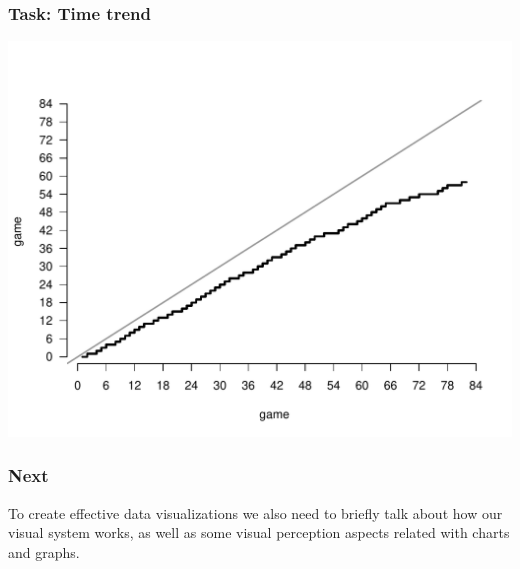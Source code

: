 \documentclass[12pt]{beamer}\usepackage[]{graphicx}\usepackage[]{color}
\makeatletter
\def\maxwidth{ %
  \ifdim\Gin@nat@width>\linewidth
    \linewidth
  \else
    \Gin@nat@width
  \fi
}
\newenvironment{knitrout}{}{} %
\makeatother
\begin{document}
\begin{frame}[fragile]
\frametitle{Task: Time trend}

\begin{knitrout}\footnotesize
{}\color{fgcolor}

{\centering \includegraphics[width=\maxwidth]{figure/task_timeline-1} 

}



\end{knitrout}

\end{frame}


\begin{frame}
\frametitle{Next}

To create effective data visualizations we also need to briefly talk about how our visual system works, as well as some visual perception aspects related with charts and graphs.

\end{frame}

\end{document}
